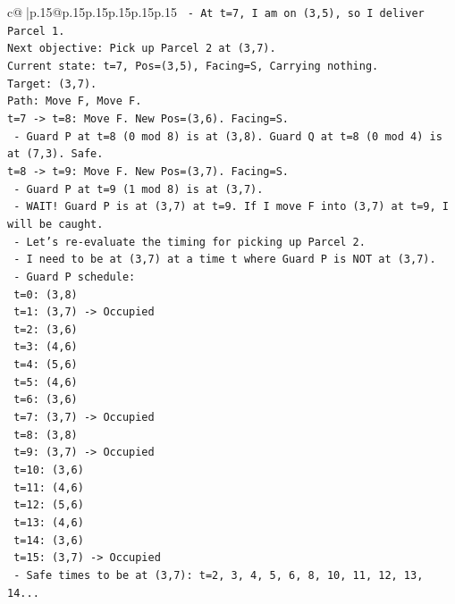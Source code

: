 \documentclass{article}
\begin{document}
{\begin{supertabular}{c@{$\;$}|p{.15\linewidth}@{}p{.15\linewidth}p{.15\linewidth}p{.15\linewidth}p{.15\linewidth}p{.15\linewidth}}
{{{\texttt{  {-} At t=7, I am on (3,5), so I deliver Parcel 1.} \\
\texttt{Next objective: Pick up Parcel 2 at (3,7).} \\
\texttt{Current state: t=7, Pos=(3,5), Facing=S, Carrying nothing.} \\
\texttt{Target: (3,7).} \\
\texttt{Path: Move F, Move F.} \\
\texttt{t=7 {-}> t=8: Move F. New Pos=(3,6). Facing=S.} \\
\texttt{  {-} Guard P at t=8 (0 mod 8) is at (3,8). Guard Q at t=8 (0 mod 4) is at (7,3). Safe.} \\
\texttt{t=8 {-}> t=9: Move F. New Pos=(3,7). Facing=S.} \\
\texttt{  {-} Guard P at t=9 (1 mod 8) is at (3,7).} \\
\texttt{  {-} WAIT! Guard P is at (3,7) at t=9. If I move F into (3,7) at t=9, I will be caught.} \\
\texttt{  {-} Let's re{-}evaluate the timing for picking up Parcel 2.} \\
\texttt{  {-} I need to be at (3,7) at a time t where Guard P is NOT at (3,7).} \\
\texttt{  {-} Guard P schedule:} \\
\texttt{    t=0: (3,8)} \\
\texttt{    t=1: (3,7) {-}> Occupied} \\
\texttt{    t=2: (3,6)} \\
\texttt{    t=3: (4,6)} \\
\texttt{    t=4: (5,6)} \\
\texttt{    t=5: (4,6)} \\
\texttt{    t=6: (3,6)} \\
\texttt{    t=7: (3,7) {-}> Occupied} \\
\texttt{    t=8: (3,8)} \\
\texttt{    t=9: (3,7) {-}> Occupied} \\
\texttt{    t=10: (3,6)} \\
\texttt{    t=11: (4,6)} \\
\texttt{    t=12: (5,6)} \\
\texttt{    t=13: (4,6)} \\
\texttt{    t=14: (3,6)} \\
\texttt{    t=15: (3,7) {-}> Occupied} \\
\texttt{  {-} Safe times to be at (3,7): t=2, 3, 4, 5, 6, 8, 10, 11, 12, 13, 14...} \\
}}}
\end{supertabular}}
\end{document}
